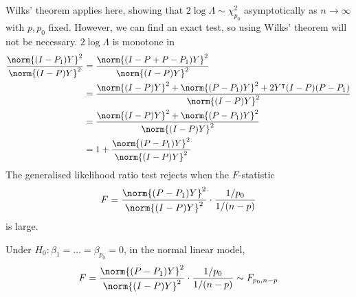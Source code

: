 Wilks' theorem applies here, showing that $2 \log \Lambda \sim \chi^2_{p_0}$ asymptotically as $n \to \infty$ with $p, p_0$ fixed.
However, we can find an exact test, so using Wilks' theorem will not be necessary.
$2 \log \Lambda$ is monotone in
\begin{align*}
	\frac{\norm{(I-P_1)Y}^2}{\norm{(I-P)Y}^2} & = \frac{\norm{(I-P+P-P_1)Y}^2}{\norm{(I-P)Y}^2}                                             \\
	                                          & = \frac{\norm{(I-P)Y}^2 + \norm{(P-P_1)Y}^2 + 2Y^\tran (I-P)(P-P_1)}{\norm{(I-P)Y}^2 } \\
	                                          & = \frac{\norm{(I-P)Y}^2 + \norm{(P-P_1)Y}^2}{\norm{(I-P)Y}^2}                               \\
	                                          & = 1 + \frac{\norm{(P-P_1)Y}^2}{\norm{(I-P)Y}^2}
\end{align*}
The generalised likelihood ratio test rejects when the $F$-statistic
\begin{align*}
	F = \frac{\norm{(P-P_1)Y}^2}{\norm{(I-P)Y}^2} \cdot \frac{1/p_0}{1/(n-p)}
\end{align*}
is large.
\begin{theorem}
	Under $H_0\colon \beta_1 = \dots = \beta_{p_0} = 0$, in the normal linear model,
	\begin{align*}
		F = \frac{\norm{(P-P_1)Y}^2}{\norm{(I-P)Y}^2} \cdot \frac{1/p_0}{1/(n-p)} \sim F_{p_0,n-p}
	\end{align*}
\end{theorem}

